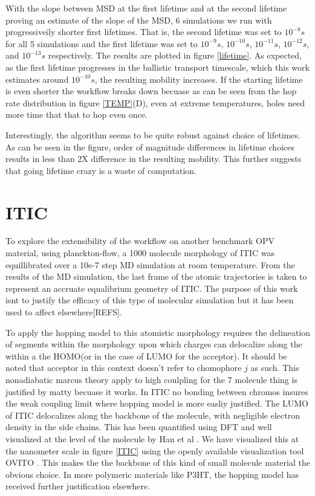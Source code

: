 With the slope between MSD at the first lifetime and at the second lifetime proving an estimate of the slope
of the MSD, 6 simulations we run with progressiveily shorter first lifetimes. That is, the second lifetime was
set to $10^{-8}s$ for all 5 simulations and the first lifetime was set to $10^{-9}s$, $10^{-10}s$,
$10^{-11}s$, $10^{-12}s$, and $10^{-13}s$ respectively. The results are plotted in figure
\ref{lifetime}. As expected, as the first lifetime progresses in the ballistic transport timescale, which this work
estimates around $10^{-10}s$, the resulting mobility increases. If the starting lifetime is even shorter the
workflow breaks down becuase as can be seen from the hop rate distribution in figure \ref{TEMP}(D), even at
extreme temperatures, holes need more time that that to hop even once. 

Interestingly, the algorithm seems to be quite robust against choice of lifetimes. As can be seen in the
figure, order of magnitude differences in lifetime choices results in less than 2X difference in the resulting
mobility. This further suggests that going lifetime crazy is a waste of computation.  

\section{ITIC}
\label{itic}

To explore the extensibility of the workflow on another benchmark OPV material, using planckton-flow, a 1000
molecule morphology of ITIC was equillibrated over a 10e-7 step MD simulation at room temperature. From the results of the MD
simulation, the last frame of the atomic trajectories is taken to represent an accruate equalibrium geometry
of ITIC. The purpose of this work isnt to justify the efficacy of this type of molecular simulation but it has
been used to affect elsewhere[REFS].

To apply the hopping model to this atomistic morphology requires the
delineation of segments within the morphology upon which charges can delocalize along the within a the HOMO(or in
the case of LUMO for the acceptor). It should be noted that acceptor in this context doesn't refer to
chomophore $j$ as such.  
This nonadiabatic marcus theory apply to high coulpling for the 7 molecule thing is justified by matty becuase
it works. In ITIC no bonding between chromos insures the weak coupling limit where hopping model is more
easliy justified.
The LUMO of ITIC delocalizes along the backbone of the molecule, with
negligible electron density in the side chains. This has been quantified using DFT and well visualized at the
level of the molecule by Han et al \cite{Han2019}. We have visualized this at the nanometer scale in figure \ref{ITIC} using the openly
available visualization tool OVITO \cite{Stukowski2010a}. This makes the the backbone of this kind of small molecule
material the obvious choice. In more polymeric materials like P3HT, the hopping model has received further
justification elsewhere. 

